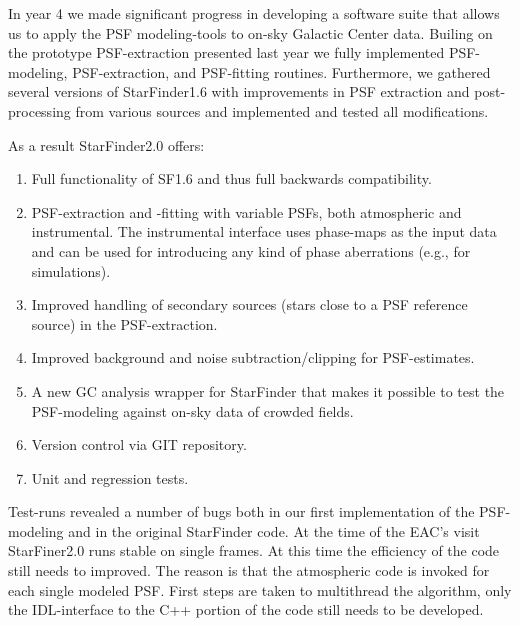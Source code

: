 In year 4 we made significant progress in developing a software suite that allows us to apply the PSF modeling-tools to on-sky Galactic Center data. Builing on the prototype PSF-extraction presented last year we fully implemented PSF-modeling, PSF-extraction, and PSF-fitting routines. Furthermore, we gathered several versions of StarFinder1.6 with improvements in PSF extraction and post-processing from various sources and implemented and tested all modifications.

As a result StarFinder2.0 offers:
\begin{enumerate}
\item Full functionality of SF1.6 and thus full backwards compatibility.
\item PSF-extraction and -fitting with variable PSFs, both atmospheric and instrumental. The instrumental interface uses phase-maps as the input data and can be used for introducing any kind of phase aberrations (e.g., for simulations).
\item Improved handling of secondary sources (stars close to a PSF reference source) in the PSF-extraction.
\item Improved background and noise subtraction/clipping for PSF-estimates.
\item A new GC analysis wrapper for StarFinder that makes it possible to test the PSF-modeling against on-sky data of crowded fields.
\item Version control via GIT repository.
\item Unit and regression tests.
\end{enumerate}
  
Test-runs revealed a number of bugs both in our first implementation of the PSF-modeling and in the original StarFinder code. At the time of the EAC's visit StarFiner2.0 runs stable on single frames. At this time the efficiency of the code still needs to improved. The reason is that the atmospheric code is invoked for each single modeled PSF. First steps are taken to multithread the algorithm, only the IDL-interface to the C++ portion of the code still needs to be developed.
  
  
